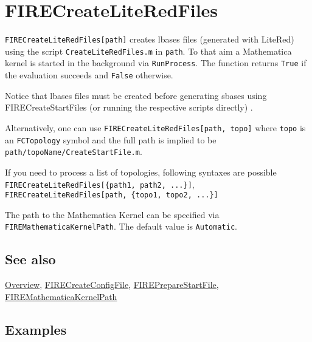 \documentclass[../FeynHelpersManual.tex]{subfiles}
\begin{document}
\hypertarget{firecreateliteredfiles}{
\section{FIRECreateLiteRedFiles}\label{firecreateliteredfiles}}

\texttt{FIRECreateLiteRedFiles[\allowbreak{}path]} creates lbases files
(generated with LiteRed) using the script \texttt{CreateLiteRedFiles.m}
in \texttt{path}. To that aim a Mathematica kernel is started in the
background via \texttt{RunProcess}. The function returns \texttt{True}
if the evaluation succeeds and \texttt{False} otherwise.

Notice that lbases files must be created before generating sbases using
FIRECreateStartFiles (or running the respective scripts directly) .

Alternatively, one can use
\texttt{FIRECreateLiteRedFiles[\allowbreak{}path,\ \allowbreak{}topo]}
where \texttt{topo} is an \texttt{FCTopology} symbol and the full path
is implied to be \texttt{path/topoName/CreateStartFile.m}.

If you need to process a list of topologies, following syntaxes are
possible
\texttt{FIRECreateLiteRedFiles[\allowbreak{}\{\allowbreak{}path1,\ \allowbreak{}path2,\ \allowbreak{}...\}]},
\texttt{FIRECreateLiteRedFiles[\allowbreak{}path,\ \allowbreak{}\{\allowbreak{}topo1,\ \allowbreak{}topo2,\ \allowbreak{}...\}]}

The path to the Mathematica Kernel can be specified via
\texttt{FIREMathematicaKernelPath}. The default value is
\texttt{Automatic}.

\subsection{See also}

\hyperlink{toc}{Overview},
\hyperlink{firecreateconfigfile}{FIRECreateConfigFile},
\hyperlink{firepreparestartfile}{FIREPrepareStartFile},
\hyperlink{firemathematicakernelpath}{FIREMathematicaKernelPath}

\subsection{Examples}
\end{document}
